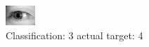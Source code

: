 \begin{figure}[h!]
\begin{center}
\includegraphics[width=0.60\columnwidth]{figures/ID3240_class_3_target_4.png}
\end{center}
\caption{ Classification: 3 actual target: 4}
\label{fig:ID3240_class_3_target_4}
\end{figure}

